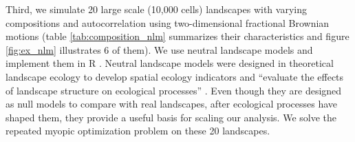 Third, we simulate 20 large scale (10,000 cells) landscapes with varying compositions and autocorrelation using two-dimensional fractional Brownian motions  (table \ref{tab:composition_nlm} summarizes their characteristics and figure \ref{fig:ex_nlm} illustrates 6 of them). We use neutral landscape models \citep{caswell_community_1976, gardner_neutral_2007} and implement them in \textsf{R} \citep{sciaini_nlmr_2018}. Neutral landscape models were designed in theoretical landscape ecology to develop spatial ecology indicators and ``evaluate the effects of landscape structure on ecological processes'' \citep{with_neutral_1997}. Even though they are designed as null models to compare with real landscapes, after ecological processes have shaped them, they provide a useful basis for scaling our analysis. We solve the repeated myopic optimization problem on these 20 landscapes.



